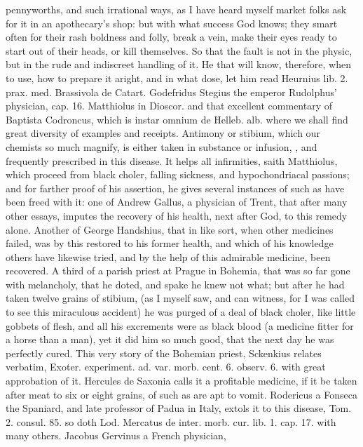 {pennyworths, and such irrational ways, as I have heard myself market
folks ask for it in an apothecary's shop: but with what success God
knows; they smart often for their rash boldness and folly, break a
vein, make their eyes ready to start out of their heads, or kill
themselves. So that the fault is not in the physic, but in the rude and
indiscreet handling of it. He that will know, therefore, when to use,
how to prepare it aright, and in what dose, let him read Heurnius lib.
2. prax. med. Brassivola de Catart. Godefridus Stegius the emperor
Rudolphus' physician, cap. 16. Matthiolus in Dioscor. and that
excellent commentary of Baptista Codroncus, which is instar omnium de
Helleb. alb. where we shall find great diversity of examples and
receipts.
Antimony or stibium, which our chemists so much magnify, is either
taken in substance or infusion, \etc{}, and frequently prescribed in this
disease. It helps all infirmities, saith Matthiolus, which
proceed from black choler, falling sickness, and hypochondriacal
passions; and for farther proof of his assertion, he gives several
instances of such as have been freed with it: one of Andrew
Gallus, a physician of Trent, that after many other essays, imputes the
recovery of his health, next after God, to this remedy alone. Another
of George Handshius, that in like sort, when other medicines failed,
was by this restored to his former health, and which of his
knowledge others have likewise tried, and by the help of this admirable
medicine, been recovered. A third of a parish priest at Prague in
Bohemia, that was so far gone with melancholy, that he doted, and
spake he knew not what; but after he had taken twelve grains of
stibium, (as I myself saw, and can witness, for I was called to see
this miraculous accident) he was purged of a deal of black choler, like
little gobbets of flesh, and all his excrements were as black blood (a
medicine fitter for a horse than a man), yet it did him so much good,
that the next day he was perfectly cured. This very story of the
Bohemian priest, Sckenkius relates verbatim, Exoter. experiment. ad.
var. morb. cent. 6. observ. 6. with great approbation of it. Hercules
de Saxonia calls it a profitable medicine, if it be taken after meat to
six or eight grains, of such as are apt to vomit. Rodericus a Fonseca
the Spaniard, and late professor of Padua in Italy, extols it to this
disease, Tom. 2. consul. 85. so doth Lod. Mercatus de inter. morb. cur.
lib. 1. cap. 17. with many others. Jacobus Gervinus a French physician,
}
